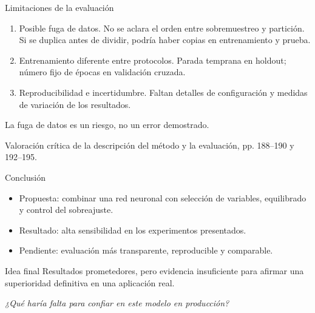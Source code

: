 \documentclass[aspectratio=169,11pt]{beamer}
\begin{document}
\begin{frame}[label={sec:org1de7dfa}]{Limitaciones de la evaluación}
\begin{enumerate}
\item \alert{Posible fuga de datos.}
No se aclara el orden entre sobremuestreo y partición. Si se duplica antes de dividir, podría haber copias en entrenamiento y prueba.
\item \alert{Entrenamiento diferente entre protocolos.}
Parada temprana en holdout; número fijo de épocas en validación cruzada.
\item \alert{Reproducibilidad e incertidumbre.}
Faltan detalles de configuración y medidas de variación de los resultados.
\end{enumerate}

\alert{La fuga de datos es un riesgo, no un error demostrado.}

\vfill
\footnotesize Valoración crítica de la descripción del método y la evaluación, pp. 188--190 y 192--195.
\end{frame}
\begin{frame}[label={sec:orgc54a0ec}]{Conclusión}
\begin{itemize}
\item \alert{Propuesta}: combinar una red neuronal con selección de variables, equilibrado y control del sobreajuste.
\item \alert{Resultado}: alta sensibilidad en los experimentos presentados.
\item \alert{Pendiente}: evaluación más transparente, reproducible y comparable.
\end{itemize}

\bigskip
\begin{block}{Idea final}
Resultados prometedores, pero evidencia insuficiente para afirmar una superioridad definitiva en una aplicación real.
\end{block}
\medskip
\centering\textit{¿Qué haría falta para confiar en este modelo en producción?}
\end{frame}
\end{document}
